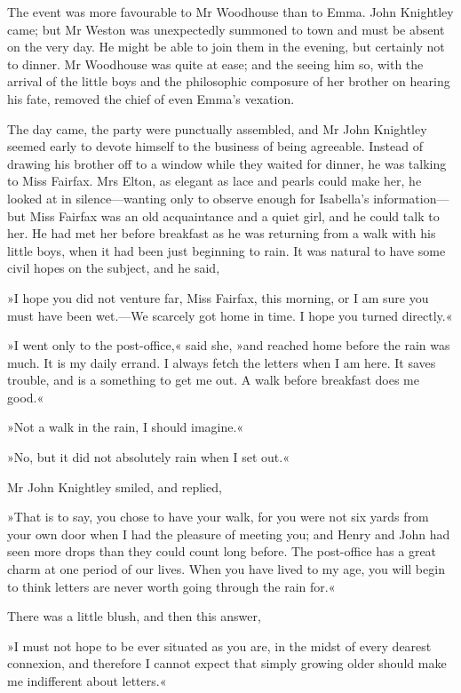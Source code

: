The event was more favourable to Mr Woodhouse than to Emma. John Knightley came; but Mr Weston was unexpectedly summoned to town and must be absent on the very day. He might be able to join them in the evening, but certainly not to dinner. Mr Woodhouse was quite at ease; and the seeing him so, with the arrival of the little boys and the philosophic composure of her brother on hearing his fate, removed the chief of even Emma's vexation.

The day came, the party were punctually assembled, and Mr John Knightley seemed early to devote himself to the business of being agreeable. Instead of drawing his brother off to a window while they waited for dinner, he was talking to Miss Fairfax. Mrs Elton, as elegant as lace and pearls could make her, he looked at in silence—wanting only to observe enough for Isabella's information—but Miss Fairfax was an old acquaintance and a quiet girl, and he could talk to her. He had met her before breakfast as he was returning from a walk with his little boys, when it had been just beginning to rain. It was natural to have some civil hopes on the subject, and he said,

»I hope you did not venture far, Miss Fairfax, this morning, or I am sure you must have been wet.—We scarcely got home in time. I hope you turned directly.«

»I went only to the post-office,« said she, »and reached home before the rain was much. It is my daily errand. I always fetch the letters when I am here. It saves trouble, and is a something to get me out. A walk before breakfast does me good.«

»Not a walk in the rain, I should imagine.«

»No, but it did not absolutely rain when I set out.«

Mr John Knightley smiled, and replied,

»That is to say, you chose to have your walk, for you were not six yards from your own door when I had the pleasure of meeting you; and Henry and John had seen more drops than they could count long before. The post-office has a great charm at one period of our lives. When you have lived to my age, you will begin to think letters are never worth going through the rain for.«

There was a little blush, and then this answer,

»I must not hope to be ever situated as you are, in the midst of every dearest connexion, and therefore I cannot expect that simply growing older should make me indifferent about letters.«

